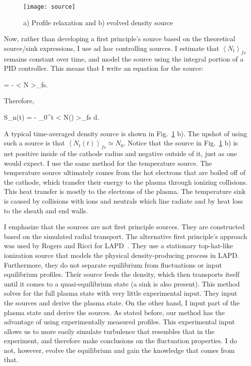 \begin{figure}[!ht]
\centerline{\texttt{[image: source]}}
\caption{a) Profile relaxation and b) evolved density source}
\label{source}
\end{figure}


Now, rather than developing a first principle's source based on the theoretical source/sink expressions, I use ad hoc controlling sources. 
I estimate that $\left< N_t \right>_{fs}$ remains constant over time, and model the source using the integral
portion of a PID controller. This means that I write an equation for the source:

\beq
\label{Sn_eq}
 = - \left< N \right>_{fs}.
\eeq

Therefore,

\beq
\label{Sn_eq2}
S_n(t) = - \int_0^t \left< N(\tau) \right>_{fs} d\tau.
\eeq

A typical time-averaged density source is shown in Fig.~\ref{source} b).
The upshot of using such a source is that $\left< N_t(t) \right>_{fs} \simeq N_0$. Notice that the source in Fig.~\ref{source} b) is net positive inside of the cathode radius and negative
outside of it, just as one would expect.
I use the same method for the temperature source. The temperature source ultimately comes from the hot electrons that are boiled off of
the cathode, which transfer their energy to the plasma through ionizing collisions. This heat transfer is mostly to the electrons of the plasma. The temperature sink is caused by collisions
with ions and neutrals which line radiate and by heat loss to the sheath and end walls.

I emphasize that the sources are not first principle sources. They are constructed based on the simulated radial transport. The alternative first principle's approach was used by Rogers and Ricci
for LAPD~\cite{rogers2010}. They use a stationary top-hat-like ionization source that models the physical density-producing process in LAPD. 
Furthermore, they do not separate equilibrium from fluctuations or input equilibrium profiles. Their source feeds the density, which then transports itself until it comes to a quasi-equilibrium state
(a sink is also present). This method solves for the full plasma state with very little experimental input. 
They input the sources and derive the plasma state. On the other hand, I input part of the plasma
state and derive the sources. As stated before, our method has the advantage of using experimentally measured profiles. 
This experimental input allows us to more easily simulate turbulence that resembles that
in the experiment, and therefore make conclusions on the fluctuation properties. I do not, however, evolve the equilibrium and gain the knowledge that comes from that.

